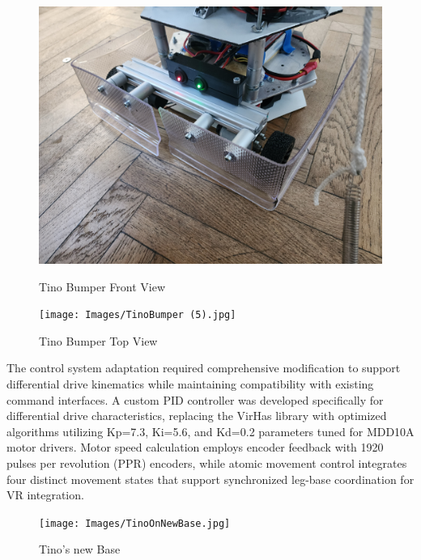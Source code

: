 \begin{figure}[H]
    \centering
    \begin{minipage}{0.45\textwidth}
        \centering
        \includegraphics[width=\textwidth]{Images/TinoBumper (4).jpg}
        \caption{Tino Bumper Front View}
        \label{fig:tino_bumper_front}
    \end{minipage}
    \hfill
    \begin{minipage}{0.45\textwidth}
        \centering
        \texttt{[image: Images/TinoBumper (5).jpg]}
        \caption{Tino Bumper Top View}
        \label{fig:tino_bumper_top}
    \end{minipage}
\end{figure}

The control system adaptation required comprehensive modification to support differential drive kinematics while maintaining compatibility with existing command interfaces. A custom PID controller was developed specifically for differential drive characteristics, replacing the VirHas library with optimized algorithms utilizing Kp=7.3, Ki=5.6, and Kd=0.2 parameters tuned for MDD10A motor drivers. Motor speed calculation employs encoder feedback with 1920 pulses per revolution (PPR) encoders, while atomic movement control integrates four distinct movement states that support synchronized leg-base coordination for VR integration.

\begin{figure}[H]
    \centering    \texttt{[image: Images/TinoOnNewBase.jpg]}
    \caption{Tino's new Base}
    \label{fig:tino_on_new_base}
\end{figure}

